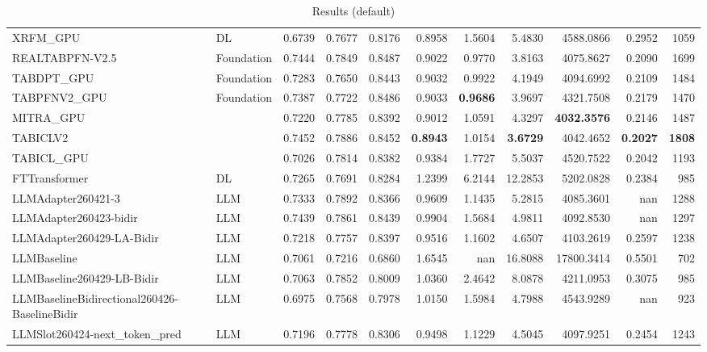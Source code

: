 \begin{table}[htbp]
{\begin{tabular}{ll|rrrrrrrr|r}
XRFM\_GPU & DL & 0.6739 & 0.7677 & 0.8176 & 0.8958 & 1.5604 & 5.4830 & 4588.0866 & 0.2952 & 1059 \\
REALTABPFN-V2.5 & Foundation & 0.7444 & 0.7849 & 0.8487 & 0.9022 & 0.9770 & 3.8163 & 4075.8627 & 0.2090 & 1699 \\
TABDPT\_GPU & Foundation & 0.7283 & 0.7650 & 0.8443 & 0.9032 & 0.9922 & 4.1949 & 4094.6992 & 0.2109 & 1484 \\
TABPFNV2\_GPU & Foundation & 0.7387 & 0.7722 & 0.8486 & 0.9033 & \textbf{0.9686} & 3.9697 & 4321.7508 & 0.2179 & 1470 \\
MITRA\_GPU &  & 0.7220 & 0.7785 & 0.8392 & 0.9012 & 1.0591 & 4.3297 & \textbf{4032.3576} & 0.2146 & 1487 \\
TABICLV2 &  & 0.7452 & 0.7886 & 0.8452 & \textbf{0.8943} & 1.0154 & \textbf{3.6729} & 4042.4652 & \textbf{0.2027} & \textbf{1808} \\
TABICL\_GPU &  & 0.7026 & 0.7814 & 0.8382 & 0.9384 & 1.7727 & 5.5037 & 4520.7522 & 0.2042 & 1193 \\
\midrule
FTTransformer & DL & 0.7265 & 0.7691 & 0.8284 & 1.2399 & 6.2144 & 12.2853 & 5202.0828 & 0.2384 & 985 \\
LLMAdapter260421-3 & LLM & 0.7333 & 0.7892 & 0.8366 & 0.9609 & 1.1435 & 5.2815 & 4085.3601 & nan & 1288 \\
LLMAdapter260423-bidir & LLM & 0.7439 & 0.7861 & 0.8439 & 0.9904 & 1.5684 & 4.9811 & 4092.8530 & nan & 1297 \\
LLMAdapter260429-LA-Bidir & LLM & 0.7218 & 0.7757 & 0.8397 & 0.9516 & 1.1602 & 4.6507 & 4103.2619 & 0.2597 & 1238 \\
LLMBaseline & LLM & 0.7061 & 0.7216 & 0.6860 & 1.6545 & nan & 16.8088 & 17800.3414 & 0.5501 & 702 \\
LLMBaseline260429-LB-Bidir & LLM & 0.7063 & 0.7852 & 0.8009 & 1.0360 & 2.4642 & 8.0878 & 4211.0953 & 0.3075 & 985 \\
LLMBaselineBidirectional260426-BaselineBidir & LLM & 0.6975 & 0.7568 & 0.7978 & 1.0150 & 1.5984 & 4.7988 & 4543.9289 & nan & 923 \\
LLMSlot260424-next\_token\_pred & LLM & 0.7196 & 0.7778 & 0.8306 & 0.9498 & 1.1229 & 4.5045 & 4097.9251 & 0.2454 & 1243 \\
\bottomrule
\end{tabular}
}
\caption{Results (default)}
\label{tab:results_default}
\end{table}